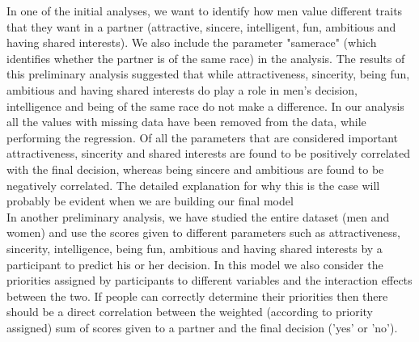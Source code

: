 \documentclass{article}
\begin{document}
In one of the initial analyses, we want to identify how men value different traits that they want in a partner (attractive, sincere, intelligent, fun, ambitious and having shared interests). We also include the parameter "samerace" (which identifies whether the partner is of the same race) in the analysis. The results of this preliminary analysis suggested that while attractiveness, sincerity, being fun, ambitious and having shared interests do play a role in men's decision, intelligence and being of the same race do not make a difference. In our analysis all the values with missing data have been removed from the data, while performing the regression. Of all the parameters that are considered important attractiveness, sincerity and shared interests are found to be positively correlated with the final decision, whereas being sincere and ambitious are found to be negatively correlated. The detailed explanation for why this is the case will probably be evident when we are building our final model\\

In another preliminary analysis, we have studied the entire dataset (men and women) and use the scores given to different parameters such as attractiveness, sincerity, intelligence, being fun, ambitious and having shared interests by a participant to predict his or her decision. In this model we also consider the priorities assigned by participants to different variables and the interaction effects between the two. If people can correctly determine their priorities then there should be a direct correlation between the weighted (according to priority assigned) sum of scores given to a partner and the final decision ('yes' or 'no'). 



 
 
\end{document}
